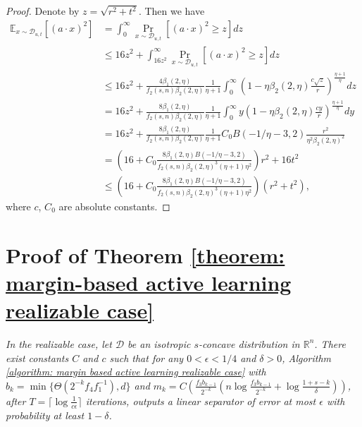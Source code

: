\documentclass[11pt]{article}
\newcommand{\cD}{\mathcal{D}}
\newcommand{\E}{\mathbb{E}}
\newcommand{\R}{\mathbb{R}}
\begin{document}
{{{{\medskip
\begin{proof}
Denote by $z=\sqrt{r^2+t^2}$. Then we have
\begin{equation}
\begin{split}
\E_{x\sim \cD_{u,t}}[(a\cdot x)^2]&=\int_0^\infty \Pr_{x\sim \cD_{u,t}}[(a\cdot x)^2\ge z]dz\\
&\le 16z^2+\int_{16z^2}^\infty \Pr_{x\sim \cD_{u,t}}[(a\cdot x)^2\ge z]dz\\
&\le 16z^2+\frac{4\beta_1(2,\eta)}{f_2(s,n)\beta_2(2,\eta)}\frac{1}{\eta+1}\int_0^\infty\left(1-\eta\beta_2(2,\eta)\frac{c\sqrt{z}}{r}\right)^{\frac{\eta+1}{\eta}}dz\\
&=16z^2+\frac{8\beta_1(2,\eta)}{f_2(s,n)\beta_2(2,\eta)}\frac{1}{\eta+1}\int_0^\infty y\left(1-\eta\beta_2(2,\eta)\frac{cy}{r}\right)^{\frac{\eta+1}{\eta}}dy\\
&=16z^2+\frac{8\beta_1(2,\eta)}{f_2(s,n)\beta_2(2,\eta)}\frac{1}{\eta+1}C_0B(-1/\eta-3,2)\frac{r^2}{\eta^2\beta_2(2,\eta)^2}\\
&=\left(16+C_0\frac{8\beta_1(2,\eta)B(-1/\eta-3,2)}{f_2(s,n)\beta_2(2,\eta)^3(\eta+1)\eta^2}\right)r^2+16t^2\\
&\le \left(16+C_0\frac{8\beta_1(2,\eta)B(-1/\eta-3,2)}{f_2(s,n)\beta_2(2,\eta)^3(\eta+1)\eta^2}\right)(r^2+t^2),
\end{split}
\end{equation}
where $c$, $C_0$ are absolute constants.
\end{proof}


\section{Proof of Theorem \ref{theorem: margin-based active learning realizable case}}
\label{section: proof of margin-based active learning realizable case}

\emph{In the realizable case, let $\cD$ be an isotropic $s$-concave distribution in $\R^n$. There exist constants $C$ and $c$ such that for any $0<\epsilon<1/4$ and $\delta>0$, Algorithm \ref{algorithm: margin based active learning realizable case} with $b_k=\min\{\Theta(2^{-k}f_4f_1^{-1}),d\}$ and $m_k=C\left(\frac{f_3b_{k-1}}{2^{-k}}\left(n\log \frac{f_3b_{k-1}}{2^{-k}}+\log \frac{1+s-k}{\delta}\right)\right)$, after $T=\lceil\log \frac{1}{c\epsilon}\rceil$ iterations, outputs a linear separator of error at most $\epsilon$ with probability at least $1-\delta$.}

}}}}
\end{document}
